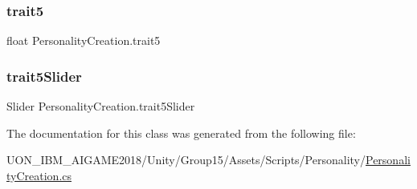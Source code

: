 \mbox{\label{class_personality_creation_a30b74c5f0348b95255194ba01d22747e}} 
\subsubsection{\texorpdfstring{trait5}{trait5}}
{\footnotesize\ttfamily float Personality\+Creation.\+trait5\hspace{0.3cm}{\ttfamily [private]}}

\mbox{\label{class_personality_creation_a21048043717bf28208f3dd28180d2521}} 
\subsubsection{\texorpdfstring{trait5Slider}{trait5Slider}}
{\footnotesize\ttfamily Slider Personality\+Creation.\+trait5\+Slider\hspace{0.3cm}{\ttfamily [private]}}



The documentation for this class was generated from the following file\+:\begin{DoxyCompactItemize}
\item 
U\+O\+N\+\_\+\+I\+B\+M\+\_\+\+A\+I\+G\+A\+M\+E2018/\+Unity/\+Group15/\+Assets/\+Scripts/\+Personality/\mbox{\hyperlink{_personality_creation_8cs}{Personality\+Creation.\+cs}}\end{DoxyCompactItemize}
